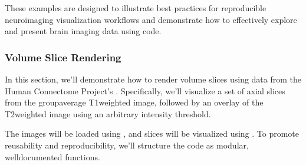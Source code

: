 \documentclass[letterpaper,10pt,english]{jupyterBook}
\begin{document}
\sphinxAtStartPar
These examples are designed to illustrate best practices for reproducible neuroimaging visualization workflows and demonstrate how to effectively explore and present brain imaging data using code.


\subsubsection{Volume Slice Rendering}
\label{\detokenize{chapters/03/03c_visualization-examples:volume-slice-rendering}}
\sphinxAtStartPar
In this section, we’ll demonstrate how to render volume slices using data from the Human Connectome Project’s . Specifically, we’ll visualize a set of axial slices from the group\sphinxhyphen{}average T1\sphinxhyphen{}weighted image, followed by an overlay of the T2\sphinxhyphen{}weighted image using an arbitrary intensity threshold.

\sphinxAtStartPar
The images will be loaded using , and slices will be visualized using . To promote reusability and reproducibility, we’ll structure the code as modular, well\sphinxhyphen{}documented functions.
\end{document}

